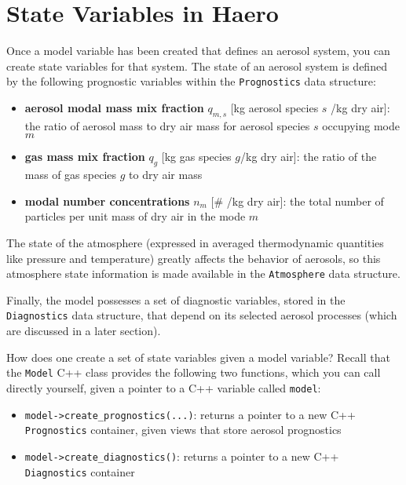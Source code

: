 \section{State Variables in Haero}

Once a model variable has been created that defines an aerosol system, you can
create state variables for that system. The state of an aerosol system is
defined by the following prognostic variables within the \texttt{Prognostics} data
structure:

\begin{itemize}
  \item {\bf aerosol modal mass mix fraction} $q_{m,s}$ [kg aerosol species $s$ /kg dry air]:
        the ratio of aerosol mass to dry air mass for aerosol species $s$
        occupying mode $m$
  \item {\bf gas mass mix fraction} $q_g$ [kg gas species $g$/kg dry air]: the
        ratio of the mass of gas species $g$ to dry air mass
  \item {\bf modal number concentrations} $n_m$ [\# /kg dry air]: the total number of
        particles per unit mass of dry air in the mode $m$
\end{itemize}

The state of the atmosphere (expressed in averaged thermodynamic quantities
like pressure and temperature) greatly affects the behavior of aerosols, so
this atmosphere state information is made available in the \texttt{Atmosphere} data
structure.

Finally, the model possesses a set of diagnostic variables, stored in the
\texttt{Diagnostics} data structure, that depend on its selected aerosol processes
(which are discussed in a later section).

How does one create a set of state variables given a model variable? Recall that
the \texttt{Model} C++ class provides the following two functions, which you can
call directly yourself, given a pointer to a C++ variable called \texttt{model}:

\begin{itemize}
  \item \texttt{model->create\_prognostics(...)}: returns a pointer to a new C++
    \texttt{Prognostics} container, given views that store aerosol prognostics
  \item \texttt{model->create\_diagnostics()}: returns a pointer to a new C++
    \texttt{Diagnostics} container
\end{itemize}

